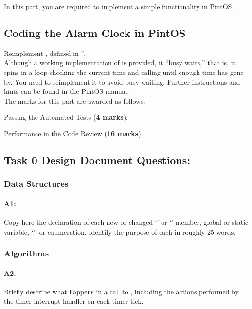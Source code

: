 \documentclass[a4paper,11pt]{article}
\begin{document}
In this part, you are required to implement a simple functionality in PintOS.

\subsection*{Coding the Alarm Clock in PintOS}
Reimplement , defined in '’.\\ 

\noindent Although a working implementation of  is provided, it “busy waits,” that is, 
it spins in a loop checking the current time and calling  until enough time has gone by. 
You need to reimplement it to avoid busy waiting. 
Further instructions and hints can be found in the PintOS manual.\\

\noindent The marks for this part are awarded as follows:

Passing the Automated Tests ({\bf 4 marks}).

Performance in the Code Review ({\bf 16 marks}).

\subsection*{Task 0 Design Document Questions:}

\subsubsection*{Data Structures}

\paragraph{A1:}
Copy here the declaration of each new or changed `' or `' member, 
global or static variable, `', or enumeration.
Identify the purpose of each in roughly 25 words.

\subsubsection*{Algorithms}

\paragraph{A2:}
Briefly describe what happens in a call to , including the actions performed by the timer interrupt handler on each timer tick.
\end{document}
